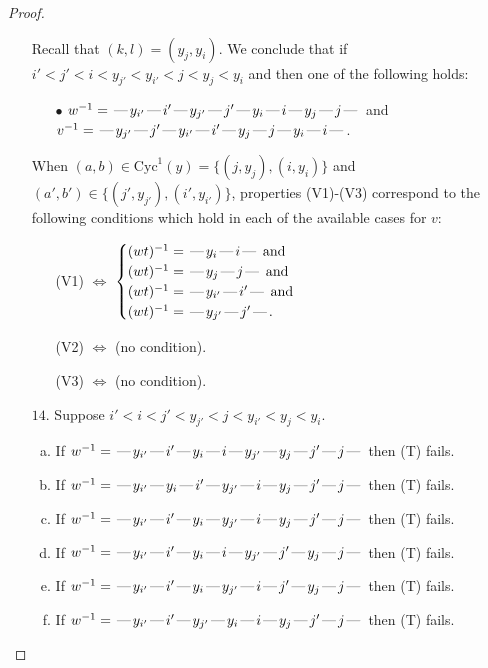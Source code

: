 \documentclass[10pt]{article}
\theoremstyle{definition}
\theoremstyle{definition}
\def\dash{\text{\hspace{0.5mm}---\hspace{0.5mm}}}
\def\Cyc{\mathrm{Cyc}}
\begin{document}
\begin{proof}
\begin{enumerate}
\begin{enumerate}[(a)]
\end{enumerate}
Recall that $(k,l) = (y_j,y_i)$.
We conclude that if $i' < j' < i < y_{j'} < y_{i'} < j < y_j < y_i$ and then one of the following holds:
\begin{enumerate}
\item[$\bullet$] $w^{-1} = \dash y_{i'}\dash i'\dash y_{j'}\dash j'\dash y_i\dash i\dash y_j\dash j\dash $ and $v^{-1} = \dash y_{j'}\dash j'\dash y_{i'}\dash i'\dash y_j\dash j\dash y_i\dash i\dash $.
\end{enumerate}
When $(a,b)\in\Cyc^1(y)=\{(j,y_j),(i,y_i)\}$ and $(a',b')\in\{(j',y_{j'}),(i',y_{i'})\}$,
properties (V1)-(V3) correspond to the following conditions which hold in
each of the available cases for $v$:
\begin{enumerate}
\item[](V1) $\Leftrightarrow$ $\begin{cases}\text{$(wt)^{-1} = \dash y_i \dash i \dash$}\text{ and }\\
\text{$(wt)^{-1} = \dash y_j \dash j \dash$}\text{ and }\\
\text{$(wt)^{-1} = \dash y_{i'} \dash i' \dash$}\text{ and }\\
\text{$(wt)^{-1} = \dash y_{j'} \dash j' \dash$}.\end{cases}$
\item[](V2) $\Leftrightarrow$ (no condition).
\item[](V3) $\Leftrightarrow$ (no condition).
\end{enumerate}
\item[$14$.] Suppose $i' < i < j' < y_{j'} < j < y_{i'} < y_j < y_i$.
\begin{enumerate}[(a)]
\item If $w^{-1} = \dash y_{i'}\dash i'\dash y_i\dash i\dash y_{j'}\dash y_j\dash j'\dash j\dash $ then (T) fails.
\item If $w^{-1} = \dash y_{i'}\dash y_i\dash i'\dash y_{j'}\dash i\dash y_j\dash j'\dash j\dash $ then (T) fails.
\item If $w^{-1} = \dash y_{i'}\dash i'\dash y_i\dash y_{j'}\dash i\dash y_j\dash j'\dash j\dash $ then (T) fails.
\item If $w^{-1} = \dash y_{i'}\dash i'\dash y_i\dash i\dash y_{j'}\dash j'\dash y_j\dash j\dash $ then (T) fails.
\item If $w^{-1} = \dash y_{i'}\dash i'\dash y_i\dash y_{j'}\dash i\dash j'\dash y_j\dash j\dash $ then (T) fails.
\item If $w^{-1} = \dash y_{i'}\dash i'\dash y_{j'}\dash y_i\dash i\dash y_j\dash j'\dash j\dash $ then (T) fails.

\end{enumerate}
\end{enumerate}
\end{proof}
\end{document}
